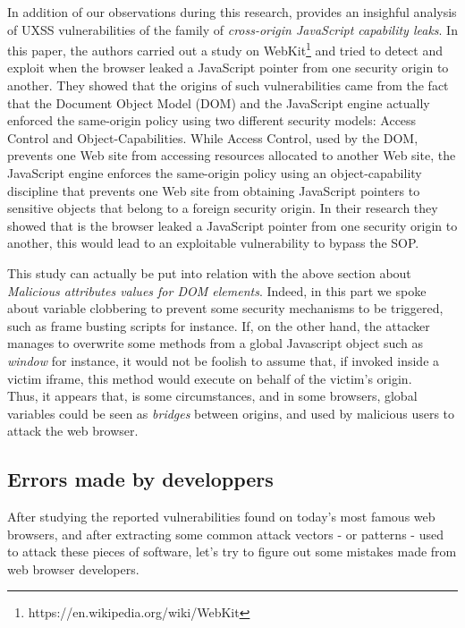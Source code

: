 \documentclass[journal]{IEEEtran}
\begin{document}
\bigskip

In addition of our observations during this research, \cite{uxssJSLeaks} provides an insighful analysis of UXSS vulnerabilities of the family of \emph{cross-origin JavaScript capability leaks}. In this paper, the authors carried out a study on WebKit\footnote{https://en.wikipedia.org/wiki/WebKit} and tried to detect and exploit when the browser leaked a JavaScript pointer from one security origin to another. They showed that the origins of such vulnerabilities came from the fact that the Document Object Model (DOM) and the JavaScript engine actually enforced the same-origin policy using two different security models: Access Control and Object-Capabilities. While Access Control, used by the DOM, prevents one Web site from accessing resources allocated to another Web site, the JavaScript engine enforces the same-origin policy using an object-capability discipline that prevents one Web site from obtaining JavaScript pointers to sensitive objects that belong to a foreign security origin. In their research they showed that is the browser leaked a JavaScript pointer from one security origin to another, this would lead to an exploitable vulnerability to bypass the SOP. 

\medskip

This study can actually be put into relation with the above section about \emph{Malicious attributes values for DOM elements}. Indeed, in this part we spoke about variable clobbering to prevent some security mechanisms to be triggered, such as frame busting scripts for instance. If, on the other hand, the attacker manages to overwrite some methods from a global Javascript object such as \emph{window} for instance, it would not be foolish to assume that, if invoked inside a victim iframe, this method would execute on behalf of the victim's origin. \\

Thus, it appears that, is some circumstances, and in some browsers, global variables could be seen as \emph{bridges} between origins, and used by malicious users to attack the web browser.


\subsection{Errors made by developpers}

After studying the reported vulnerabilities found on today's most famous web browsers, and after extracting some common attack vectors - or patterns - used to attack these pieces of software, let's try to figure out some mistakes made from web browser developers.
\end{document}
